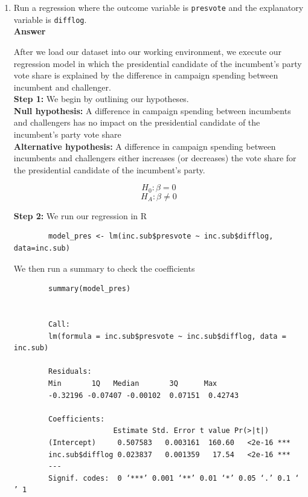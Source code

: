 \documentclass[12pt,letterpaper]{article}
\begin{document}
	\begin{enumerate}
		\item Run a regression where the outcome variable is \texttt{presvote} and the explanatory variable is \texttt{difflog}. \\
		
		\noindent 
		\textbf{Answer}
		
		After we load our dataset into our working environment, we execute our regression
		model in which the presidential candidate of the incumbent's party vote share is explained by the difference in campaign spending between incumbent and challenger. \\
		
		
		
		\textbf{Step 1:} We begin by outlining our hypotheses. \\
		
		\textbf{Null hypothesis: }
		A difference in campaign spending between incumbents and challengers has no impact on the presidential candidate of the incumbent's party vote share \\
		
		\textbf{Alternative hypothesis: }
		A difference in campaign spending between incumbents and challengers either increases (or decreases) the vote share for the presidential candidate of the incumbent's party.
		
		$$H_0: \beta = 0$$
		$$H_A: \beta \neq 0$$
		
		\vspace{.25cm}
		
		
		\textbf{Step 2:} We run our regression in R
		
		\begin{verbatim}
		model_pres <- lm(inc.sub$presvote ~ inc.sub$difflog, data=inc.sub)

		\end{verbatim}
		
		We then run a summary to check the coefficients
		
		\begin{verbatim}
		summary(model_pres)

			
		Call:
		lm(formula = inc.sub$presvote ~ inc.sub$difflog, data = inc.sub)
		
		Residuals:
		Min       1Q   Median       3Q      Max 
		-0.32196 -0.07407 -0.00102  0.07151  0.42743 
		
		Coefficients:
		               Estimate Std. Error t value Pr(>|t|)    
		(Intercept)     0.507583   0.003161  160.60   <2e-16 ***
		inc.sub$difflog 0.023837   0.001359   17.54   <2e-16 ***
		---
		Signif. codes:  0 ‘***’ 0.001 ‘**’ 0.01 ‘*’ 0.05 ‘.’ 0.1 ‘ ’ 1
		

\end{verbatim}
\end{enumerate}
\end{document}

